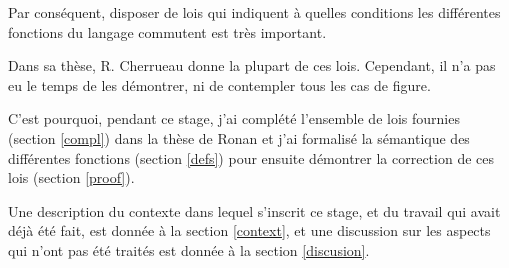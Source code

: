 Par conséquent, disposer de lois qui indiquent à quelles conditions les différentes
fonctions du langage commutent est très important.

Dans sa thèse, R. Cherrueau donne la plupart de ces lois.
Cependant,
il n'a pas eu le temps de les démontrer, ni de contempler tous les cas de figure.

C'est pourquoi, pendant ce stage, 
j'ai complété l'ensemble de lois fournies
(section \ref{compl}) dans la thèse de Ronan
et j'ai formalisé la sémantique des différentes fonctions
(section \ref{defs}) pour ensuite
démontrer la correction de ces lois (section \ref{proof}).

Une description du contexte dans lequel s'inscrit ce stage,
et du travail qui avait déjà été fait,
est donnée à la section \ref{context},
et une discussion sur les aspects qui n'ont pas été traités
est donnée à la section \ref{discusion}.